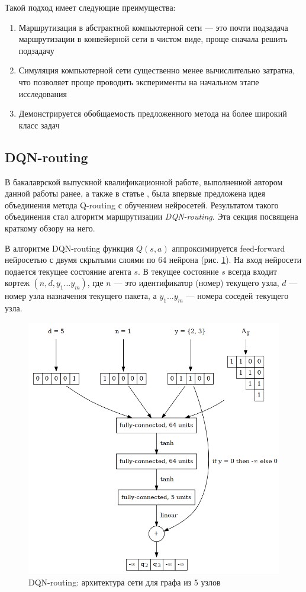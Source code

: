\documentclass[specification,annotation,times]{itmo-student-thesis}
\theoremstyle{definition}
\begin{document}
Такой подход имеет следующие преимущества:

\begin{enumerate}
\item Маршрутизация в абстрактной компьютерной сети --- это почти подзадача
  маршрутизации в конвейерной сети в чистом виде, проще сначала решить подзадачу
\item Симуляция компьютерной сети существенно менее вычислительно затратна, что
  позволяет проще проводить эксперименты на начальном этапе исследования
\item Демонстрируется обобщаемость предложенного метода на более широкий класс
  задач
\end{enumerate}

\subsection{DQN-routing}

В бакалаврской выпускной квалификационной работе, выполненной автором данной
работы ранее, а также в статье \cite{mukhutdinov2019multi}, была впервые
предложена идея объединения метода Q-routing с обучением нейросетей. Результатом
такого объединения стал алгоритм маршрутизации \textit{DQN-routing}. Эта
секция посвящена краткому обзору на него.

В алгоритме DQN-routing функция $Q(s, a)$ аппроксимируется feed-forward
нейросетью с двумя скрытыми слоями по 64 нейрона (рис. \ref{nn-pic-2}). На вход
нейросети подается
текущее состояние агента $s$. В текущее состояние $s$ всегда входит кортеж $(n,
d, y_1 ... y_m)$, где $n$ --- это идентификатор (номер) текущего узла, $d$ ---
номер узла назначения текущего пакета, а $y_1 ... y_m$ --- номера соседей
текущего узла.

\begin{figure}[!h]
  \caption{DQN-routing: архитектура сети для графа из 5 узлов}\label{nn-pic-2}
  \centering
  \includegraphics[scale=0.5]{nn-2}
\end{figure}
\end{document}
